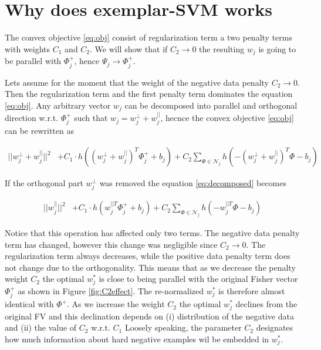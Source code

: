 \documentclass[table]{article} %
\begin{document}
\section{Why does exemplar-SVM works}
  	The convex objective \eqref{eq:obj} consist of regularization term a two penalty terms with weights $C_1$ and $C_2$. We will show that if $C_2 \rightarrow 0$ the resulting $w_j$ is going to be parallel with $\Phi_j^+$, hence $\Psi_j \rightarrow \Phi^+_j$.

  	Lets assume for the moment that the weight of the negative data penalty $C_2 \rightarrow 0$. Then the regularization term and the first penalty term dominates the equation \eqref{eq:obj}. Any arbitrary vector $w_j$ can be decomposed into parallel and orthogonal direction w.r.t. $\Phi_j^+$ such that $w_j=w_j^{\perp}+w_j^{||}$, hecnce the convex objective \eqref{eq:obj} can be rewritten as

 	\begin{align}
        ||w_j^{\perp}+w_j^{||}||^{2}& +C_1 \cdot h((w_j^{\perp}+w_j^{||})^T\Phi^+_j+b_j)
                         +C_2\sum_{\Phi\in \mathcal N_j}h(-(w_j^{\perp}+w_j^{||})^T\Phi-b_j) 	
       	\label{eq:decomposed} 
  	\end{align}

  	If the orthogonal part $w_j^{\perp}$ was removed the equation \eqref{eq:decomposed} becomes

 	\begin{align}
        ||w_j^{||}||^{2}& +C_1 \cdot h(w_j^{||T}\Phi^+_j+b_j)
                         +C_2\sum_{\Phi\in \mathcal N_j} h(-w_j^{||T}\Phi-b_j) 	
       	\label{eq:removed} 
  	\end{align}

  	Notice that this operation has affected only two terms. The negative data penalty term has changed, however this change was negligible since $C_2 \rightarrow 0$. The regularization term always decreases, while the positive data penalty term does not change due to the orthogonality. This means that as we decrease the penalty weight $C_2$ the optimal $w_j^*$ is close to being parallel with the original Fisher vector $\Phi_j^+$ as shown in Figure \ref{fig:C2effect}. The re-normalized $w_j^*$ is therefore almost identical with $\Phi^+$. As we increase the weight $C_2$ the optimal $w_j^*$ declines from the original FV and this declination depends on (i) distribution of the negative data and (ii) the value of $C_2$ w.r.t. $C_1$ Loosely speaking, the parameter $C_2$ designates how much information about hard negative examples wil be embedded in $w_j^*$.
\end{document}
